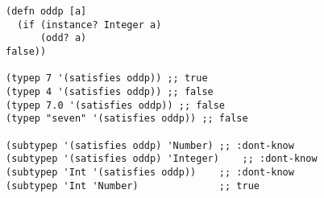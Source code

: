 \begin{lstlisting}[style=reclojureClojure]
(defn oddp [a]
  (if (instance? Integer a)
      (odd? a)
false))

(typep 7 '(satisfies oddp)) ;; true
(typep 4 '(satisfies oddp)) ;; false
(typep 7.0 '(satisfies oddp)) ;; false
(typep "seven" '(satisfies oddp)) ;; false

(subtypep '(satisfies oddp) 'Number) ;; :dont-know
(subtypep '(satisfies oddp) 'Integer)    ;; :dont-know
(subtypep 'Int '(satisfies oddp))    ;; :dont-know
(subtypep 'Int 'Number)              ;; true
\end{lstlisting}
